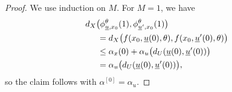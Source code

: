 \documentclass[letterpaper, 10 pt, conference]{IEEEconf}  %
\newcommand{\s}{\phi} %
\newcommand{\is}[1]{{\underline{#1}}} %
\theoremstyle{theorem}
\theoremstyle{definition}
\theoremstyle{remark}
\begin{document}
\begin{proof} 
We use induction on $M$. 
For $M=1$, we have
\begin{align*}
     & d_X \big(\s_{\is{u},x_0}^\theta(1), \s_{\is{u}',x_0}^\theta(1) \big) \\
        & \hspace{0.5cm} = d_X\big( f(x_0,\is{u}(0),\theta), f(x_0,\is{u}'(0),\theta) \big) \\
    & \hspace{0.5cm}\leq \alpha_x(0) + \alpha_u\big( d_U(\is{u}(0),\is{u}'(0)) \big) \\
    & \hspace{0.5cm}= \alpha_u \big( d_U(\is{u}(0),\is{u}'(0)) \big),
\end{align*}
so the claim follows with $\alpha^{[0]}=\alpha_u$.


\end{proof}
\end{document}
